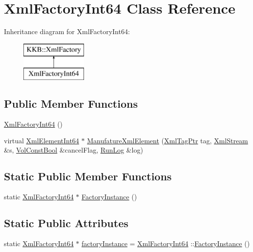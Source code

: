 \hypertarget{class_xml_factory_int64}{}\section{Xml\+Factory\+Int64 Class Reference}
\label{class_xml_factory_int64}
Inheritance diagram for Xml\+Factory\+Int64\+:\begin{figure}[H]
\begin{center}
\leavevmode
\includegraphics[height=2.000000cm]{class_xml_factory_int64}
\end{center}
\end{figure}
\subsection*{Public Member Functions}
\begin{DoxyCompactItemize}
\item 
\hyperlink{class_xml_factory_int64_a7815e24f495626b564308007de5de082}{Xml\+Factory\+Int64} ()
\item 
virtual \hyperlink{class_k_k_b_1_1_xml_element_int64}{Xml\+Element\+Int64} $\ast$ \hyperlink{class_xml_factory_int64_a2055f1a18883629473edb372ac6ecec4}{Manufature\+Xml\+Element} (\hyperlink{namespace_k_k_b_a9253a3ea8a5da18ca82be4ca2b390ef0}{Xml\+Tag\+Ptr} tag, \hyperlink{class_k_k_b_1_1_xml_stream}{Xml\+Stream} \&s, \hyperlink{namespace_k_k_b_a7d390f568e2831fb76b86b56c87bf92f}{Vol\+Const\+Bool} \&cancel\+Flag, \hyperlink{class_k_k_b_1_1_run_log}{Run\+Log} \&log)
\end{DoxyCompactItemize}
\subsection*{Static Public Member Functions}
\begin{DoxyCompactItemize}
\item 
static \hyperlink{class_xml_factory_int64}{Xml\+Factory\+Int64} $\ast$ \hyperlink{class_xml_factory_int64_a151b7cd34be0532ad1bc8c37d14fa1dd}{Factory\+Instance} ()
\end{DoxyCompactItemize}
\subsection*{Static Public Attributes}
\begin{DoxyCompactItemize}
\item 
static \hyperlink{class_xml_factory_int64}{Xml\+Factory\+Int64} $\ast$ \hyperlink{class_xml_factory_int64_acef17160c4d9adde506453fb465e1261}{factory\+Instance} = \hyperlink{class_xml_factory_int64}{Xml\+Factory\+Int64} \+::\hyperlink{class_xml_factory_int64_a151b7cd34be0532ad1bc8c37d14fa1dd}{Factory\+Instance} ()
\end{DoxyCompactItemize}


